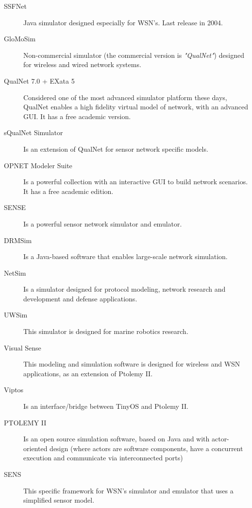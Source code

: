 \begin{description}
	\item [SSFNet] 
	Java simulator designed especially for WSN's. Last release in 2004.

	\item [GloMoSim] 
	Non-commercial simulator (the commercial version is \textit{"QualNet"}) designed for wireless and wired network systems.

	\item [QualNet 7.0 + EXata 5] 
	Considered one of the most advanced simulator platform these days, QualNet enables a high fidelity virtual model of network, with an advanced GUI. It has a free academic version.

	\item [sQualNet Simulator] 
	Is an extension of QualNet for sensor network specific models. 

	\item [OPNET Modeler Suite] 
	Is a powerful collection with an interactive GUI to build network scenarios. It has a free academic edition. 

	\item [SENSE] 
	Is a powerful sensor network simulator and emulator.

	\item [DRMSim] 
	Is a Java-based software that enables large-scale network simulation.

	\item [NetSim] 
	Is a simulator designed for protocol modeling, network research and development and defense applications.

	\item [UWSim] 
	This simulator is designed for marine robotics research.

	\item [Visual Sense] 
	This modeling and simulation software is designed for wireless and WSN applications, as an extension of Ptolemy II.

	\item [Viptos] 
	Is an interface/bridge between TinyOS and Ptolemy II.

	\item [PTOLEMY II] 
	Is an open source simulation software, based on Java and with actor-oriented design (where actors are software components, have a concurrent execution and communicate via interconnected ports)
	
	\item [SENS] 
	This specific framework for WSN's simulator and emulator that uses a simplified sensor model.
	

\end{description}

